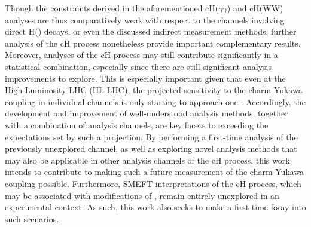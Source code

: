 Though the constraints derived in the aforementioned cH($\gamma\gamma$) and cH(WW) analyses are thus comparatively weak with respect to the channels involving direct H(\ccbar) decays, or even the discussed indirect measurement methods, further analysis of the cH process nonetheless provide important complementary results. Moreover, analyses of the cH process may still contribute significantly in a statistical combination, especially since there are still significant analysis improvements to explore. This is especially important given that even at the High-Luminosity LHC (HL-LHC), the projected sensitivity to the charm-Yukawa coupling in individual channels is only starting to approach one \cite{PhysRevD.111.053003}. Accordingly, the development and improvement of well-understood analysis methods, together with a combination of analysis channels, are key facets to exceeding the expectations set by such a projection. By performing a first-time analysis of the previously unexplored \cHZZ channel, as well as exploring novel analysis methods that may also be applicable in other analysis channels of the cH process, this work intends to contribute to making such a future measurement of the charm-Yukawa coupling possible. Furthermore, SMEFT interpretations of the cH process, which may be associated with modifications of \kappac, remain entirely unexplored in an experimental context. As such, this work also seeks to make a first-time foray into such scenarios.